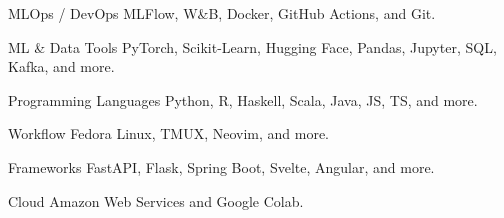 

\begin{cvskills}

\cvskill
  {MLOps / DevOps} {MLFlow, W\&B, Docker, GitHub Actions, and Git.}

\cvskill
  {ML \& Data Tools}
  {PyTorch, Scikit-Learn, Hugging Face, Pandas, Jupyter, SQL, Kafka, and more.}

\cvskill
  {Programming Languages}
  {Python, R, Haskell, Scala, Java, JS, TS, and more.}

\cvskill
  {Workflow}
  {Fedora Linux, TMUX, Neovim, and more.}

\cvskill
  {Frameworks}
  {FastAPI, Flask, Spring Boot, Svelte, Angular, and more.}

\cvskill
  {Cloud}
  {Amazon Web Services and Google Colab.}

\end{cvskills}
